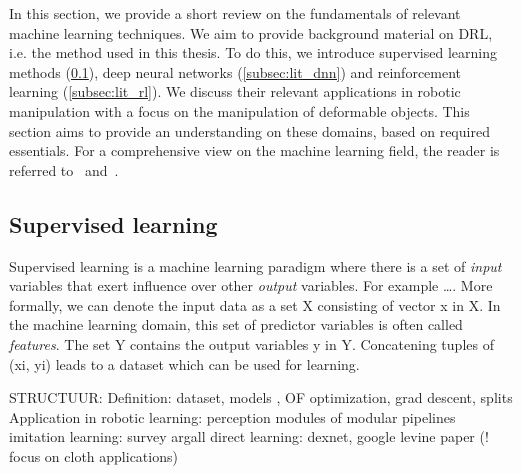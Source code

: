 \documentclass[\home/main.tex]{subfiles}
\begin{document}
In this section, we provide a short review on the fundamentals of relevant machine learning techniques. We aim to provide background material on \acrfull{DRL}, i.e. the method used in this thesis. To do this, we introduce supervised learning methods (\cref{subsec:lit_sl}), deep neural networks (\cref{subsec:lit_dnn}) and reinforcement learning (\cref{subsec:lit_rl}). We discuss their relevant applications in robotic manipulation with a focus on the manipulation of deformable objects. This section aims to provide an understanding on these domains, based on required essentials. For a comprehensive view on the machine learning field, the reader is referred to~\autocite{Friedman2001} and~\autocite{Bishop2006}.

\subsection{Supervised learning} \label{subsec:lit_sl}




Supervised learning is a machine learning paradigm where there is a set of \textit{input} variables that exert influence over other \textit{output} variables. For example \dots. More formally, we can denote the input data as a set X consisting of vector x in X. In the machine learning domain, this set of predictor variables is often called \textit{features}. The set Y contains the output variables y in Y. Concatening tuples of (xi, yi) leads to a dataset which can be used for learning. 

STRUCTUUR:
	Definition: dataset, models , OF optimization, grad descent, splits 
	Application in robotic learning:
		perception modules of modular pipelines
		imitation learning: survey argall 
		direct learning: dexnet, google levine paper 
		(! focus on cloth applications)
\end{document}

